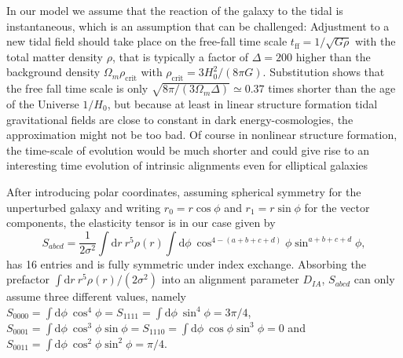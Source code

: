 \documentclass[a4paper,fleqn,usenatbib]{mnras}
\newcommand{\dd}{\mathrm{d}}
\begin{document}
In our model we assume that the reaction of the galaxy to the tidal is instantaneous, which is an assumption that can be challenged: Adjustment to a new tidal field should take place on the free-fall time scale $t_\mathrm{ff} = 1/\sqrt{G\rho}$ with the total matter density $\rho$, that is typically a factor of $\Delta = 200$ higher than the background density $\Omega_m\rho_\mathrm{crit}$ with $\rho_\mathrm{crit} = 3H_0^2/(8\pi G)$. Substitution shows that the free fall time scale is only $\sqrt{8\pi/(3\Omega_m\Delta)}\simeq 0.37$ times shorter than the age of the Universe $1/H_0$, but because at least in linear structure formation tidal gravitational fields are close to constant in dark energy-cosmologies, the approximation might not be too bad. Of course in nonlinear structure formation, the time-scale of evolution would be much shorter and could give rise to an interesting time evolution of intrinsic alignments even for elliptical galaxies \citep{lee_nonlinear_2007, schafer_galactic_2012, schmitz_time_2018} 

After introducing polar coordinates, assuming spherical symmetry for the unperturbed galaxy and writing $r_0=r\cos\phi$ and $r_1=r\sin\phi$ for the vector components, the elasticity tensor is in our case given by
\begin{equation}
S_{abcd} = 
\frac{1}{2\sigma^2}\int\dd r\:r^5\rho(r)\int\dd\phi\:\cos^{4-(a+b+c+d)}\phi\sin^{a+b+c+d}\phi,
\end{equation}
has 16 entries and is fully symmetric under index exchange. Absorbing the prefactor $\int\dd r\:r^5\rho(r)/(2\sigma^2)$ into an alignment parameter $D_{IA}$, $S_{abcd}$ can only assume three different values, namely $S_{0000} = \int\dd\phi\:\cos^4\phi = S_{1111} = \int\dd\phi\:\sin^4\phi = 3\pi/4$, $S_{0001} = \int\dd\phi\:\cos^3\phi\sin\phi = S_{1110} = \int\dd\phi\:\cos\phi\sin^3\phi = 0$ and $S_{0011} = \int\dd\phi\:\cos^2\phi\sin^2\phi = \pi/4$.
\end{document}
